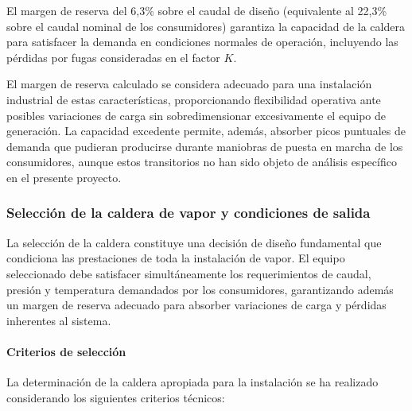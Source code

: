 El margen de reserva del 6,3\% sobre el caudal de diseño (equivalente al 22,3\% sobre el caudal nominal de los consumidores) garantiza la capacidad de la caldera para satisfacer la demanda en condiciones normales de operación, incluyendo las pérdidas por fugas consideradas en el factor $K$.

El margen de reserva calculado se considera adecuado para una instalación industrial de estas características, proporcionando flexibilidad operativa ante posibles variaciones de carga sin sobredimensionar excesivamente el equipo de generación. La capacidad excedente permite, además, absorber picos puntuales de demanda que pudieran producirse durante maniobras de puesta en marcha de los consumidores, aunque estos transitorios no han sido objeto de análisis específico en el presente proyecto.


\subsubsection{Selección de la caldera de vapor y condiciones de salida}
\label{subsubsec:seleccion-caldera-vitomax}

La selección de la caldera constituye una decisión de diseño fundamental que condiciona las prestaciones de toda la instalación de vapor. El equipo seleccionado debe satisfacer simultáneamente los requerimientos de caudal, presión y temperatura demandados por los consumidores, garantizando además un margen de reserva adecuado para absorber variaciones de carga y pérdidas inherentes al sistema.

\paragraph{Criterios de selección}

La determinación de la caldera apropiada para la instalación se ha realizado considerando los siguientes criterios técnicos:

